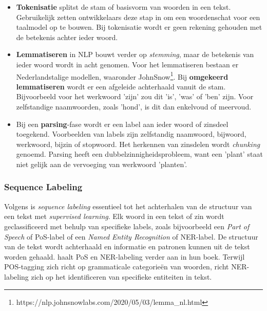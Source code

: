 \begin{itemize}
	\item \textbf{Tokenisatie} splitst de stam of basisvorm van woorden in een tekst. Gebruikelijk zetten ontwikkelaars deze stap in om een woordenschat voor een taalmodel op te bouwen. Bij tokenisatie wordt er geen rekening gehouden met de betekenis achter ieder woord.
	\item \textbf{Lemmatiseren} in NLP bouwt verder op \textit{stemming}, maar de betekenis van ieder woord wordt in acht genomen. Voor het lemmatiseren bestaan er Nederlandstalige modellen, waaronder JohnSnow\footnote{https://nlp.johnsnowlabs.com/2020/05/03/lemma\_nl.html}. Bij \textbf{omgekeerd lemmatiseren} wordt er een afgeleide achterhaald vanuit de stam. Bijvoorbeeld voor het werkwoord 'zijn' zou dit 'is', 'was' of 'ben' zijn. Voor zelfstandige naamwoorden, zoals 'hond', is dit dan enkelvoud of meervoud.
	\item Bij een \textbf{parsing}-fase wordt er een label aan ieder woord of zinsdeel toegekend. Voorbeelden van labels zijn zelfstandig naamwoord, bijwoord, werkwoord, bijzin of stopwoord. Het herkennen van zinsdelen wordt \textit{chunking} genoemd. Parsing heeft een dubbelzinnigheidsprobleem, want een 'plant' staat niet gelijk aan de vervoeging van werkwoord 'planten'.
\end{itemize}

\subsubsection{Sequence Labeling}

Volgens \textcite{Eisenstein2019} is \textit{sequence labeling} essentieel tot het achterhalen van de structuur van een tekst met \textit{supervised learning}. Elk woord in een tekst of zin wordt geclassificeerd met behulp van specifieke labels, zoals bijvoorbeeld een \textit{Part of Speech} of PoS-label of een \textit{Named Entity Recognition} of NER-label. De structuur van de tekst wordt achterhaald en informatie en patronen kunnen uit de tekst worden gehaald. \textcite{Jurafsky2014} haalt PoS en NER-labeling verder aan in hun boek. Terwijl POS-tagging zich richt op grammaticale categorieën van woorden, richt NER-labeling zich op het identificeren van specifieke entiteiten in tekst. 

